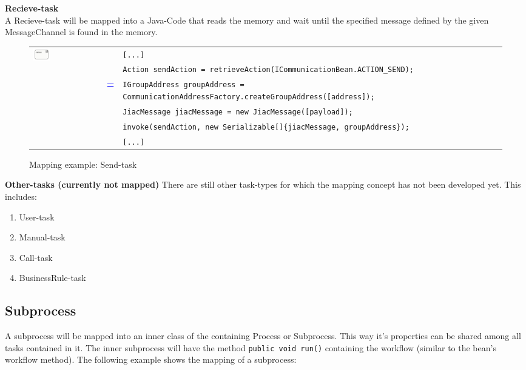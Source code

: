 \textbf{Recieve-task}\\
A Recieve-task will be mapped into a Java-Code that reads the memory and wait until the specified message defined by the given MessageChannel is found in the memory. \\

\begin{figure}[h]
\begin{tabularx}{\linewidth}{lcX}
	\multirow{6}{*}{\includegraphics[width=0.25\textwidth]{images/mapping/recieveTask.png}} & & \texttt{[...]}\\
	& & \texttt{Action sendAction = retrieveAction(ICommunicationBean.ACTION\_SEND);}\\
	& \textbf{\textcolor{blue}{=}} & \texttt{IGroupAddress groupAddress = CommunicationAddressFactory.createGroupAddress([address]);}\\
	& & \texttt{JiacMessage jiacMessage = new JiacMessage([payload]);}\\
	& & \texttt{invoke(sendAction, new Serializable[]\{jiacMessage, groupAddress\});}\\
 & & \texttt{[...]}
\end{tabularx}
\caption{Mapping example: Send-task}%
\label{fig:recieve_task}%
\end{figure}


\textbf{Other-tasks (currently not mapped)}
There are still other task-types for which the mapping concept has not been developed yet. This includes:
\begin{enumerate}
	\item User-task
	\item Manual-task
	\item Call-task
	\item BusinessRule-task
\end{enumerate}


\subsection{Subprocess}
A subprocess will be mapped into an inner class of the containing Process or Subprocess. This way it's properties can be shared among all tasks contained in it. The inner subprocess will have the method \texttt{public void run()} containing the workflow (similar to the bean's workflow method). The following example shows the mapping of a subprocess:\\

